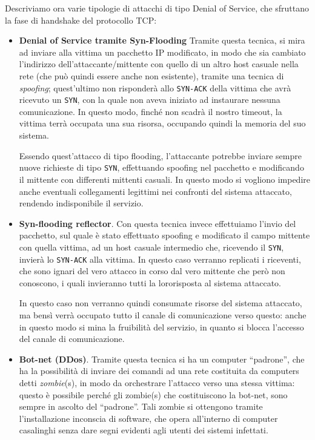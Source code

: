 Descriviamo ora varie tipologie di attacchi di tipo Denial of Service, che 
sfruttano la fase di handshake del protocollo TCP:
\begin{itemize}
\item\textbf{Denial of Service tramite Syn-Flooding} Tramite questa tecnica, si mira 
	ad inviare alla vittima un pacchetto IP modificato, in modo che sia
	cambiato l'indirizzo dell'attaccante/mittente con quello di un altro host
	casuale nella rete (che può quindi essere anche non esistente), 
	tramite una tecnica di \textit{spoofing}; quest'ultimo  non risponderà allo 
	\texttt{SYN-ACK} della vittima che avrà ricevuto un \texttt{SYN}, con la quale 
	non aveva iniziato  ad instaurare nessuna comunicazione. In questo modo,
	finché non scadrà il nostro timeout, la vittima terrà occupata una
	sua risorsa, occupando quindi la memoria del suo sistema. 
	
	Essendo quest'attacco di tipo flooding, l'attaccante potrebbe inviare
	sempre nuove richieste di tipo \texttt{SYN}, effettuando spoofing nel pacchetto
	e modificando il mittente con differenti mittenti casuali. In questo modo
	si vogliono impedire anche eventuali collegamenti legittimi nei 
	confronti del sistema attaccato, rendendo indisponibile il servizio.
\item \textbf{Syn-flooding reflector}.  Con questa tecnica invece effettuiamo l'invio
	del pacchetto, sul quale è stato effettuato spoofing e modificato il
	campo mittente con quella vittima, ad un host casuale intermedio che,
	ricevendo il \texttt{SYN}, invierà lo \texttt{SYN-ACK} alla vittima. In questo
	caso verranno replicati i riceventi, che sono ignari del vero attacco
	in corso dal vero mittente che però non conoscono, i quali invieranno 
	tutti la lororisposta al sistema attaccato. 
	
	In questo caso non verranno quindi consumate risorse del
	sistema attaccato, ma bensì verrà occupato tutto il canale di comunicazione
	verso questo: anche in questo modo si mina la fruibilità del servizio,
	in quanto si blocca l'accesso del canale di comunicazione.
\item\textbf{Bot-net (DDos)}. Tramite questa tecnica si ha un computer ``padrone'', che ha 
	la possibilità di inviare dei comandi ad una rete costituita da computers detti
	\textit{zombie}(s), in modo da orchestrare l'attacco verso una stessa vittima:
	questo è possibile perché gli zombie(s) che costituiscono la bot-net,
	sono sempre in ascolto del ``padrone''.  Tali zombie si ottengono
	tramite l'installazione inconscia di software, che opera all'interno di
	computer casalinghi senza dare segni evidenti agli utenti dei sistemi
	infettati.
\end{itemize}



